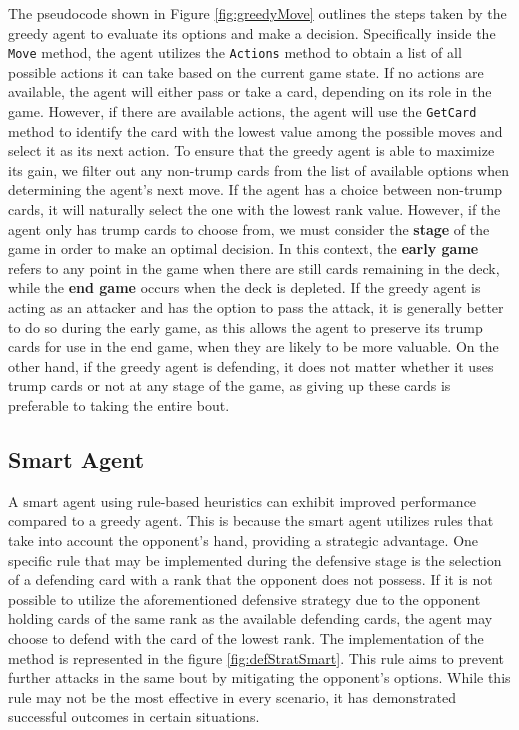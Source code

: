 The pseudocode shown in Figure \ref{fig:greedyMove} outlines the steps taken by the greedy agent to evaluate its options and make a decision. Specifically inside the \texttt{Move} method, the agent utilizes the \texttt{Actions} method to obtain a list of all possible actions it can take based on the current game state. If no actions are available, the agent will either pass or take a card, depending on its role in the game. However, if there are available actions, the agent will use the \texttt{GetCard} method to identify the card with the lowest value among the possible moves and select it as its next action. To ensure that the greedy agent is able to maximize its gain, we filter out any non-trump cards from the list of available options when determining the agent's next move. If the agent has a choice between non-trump cards, it will naturally select the one with the lowest rank value. However, if the agent only has trump cards to choose from, we must consider the \textbf{stage} of the game in order to make an optimal decision. In this context, the \textbf{early game} refers to any point in the game when there are still cards remaining in the deck, while the \textbf{end game} occurs when the deck is depleted. If the greedy agent is acting as an attacker and has the option to pass the attack, it is generally better to do so during the early game, as this allows the agent to preserve its trump cards for use in the end game, when they are likely to be more valuable. On the other hand, if the greedy agent is defending, it does not matter whether it uses trump cards or not at any stage of the game, as giving up these cards is preferable to taking the entire bout.

\subsection{Smart Agent}
\label{smart}
A smart agent using rule-based heuristics can exhibit improved performance compared to a greedy agent. This is because the smart agent utilizes rules that take into account the opponent's hand, providing a strategic advantage. One specific rule that may be implemented during the defensive stage is the selection of a defending card with a rank that the opponent does not possess. If it is not possible to utilize the aforementioned defensive strategy due to the opponent holding cards of the same rank as the available defending cards, the agent may choose to defend with the card of the lowest rank.  The implementation of the method is represented in the figure \ref{fig:defStratSmart}. This rule aims to prevent further attacks in the same bout by mitigating the opponent's options. While this rule may not be the most effective in every scenario, it has demonstrated successful outcomes in certain situations.

